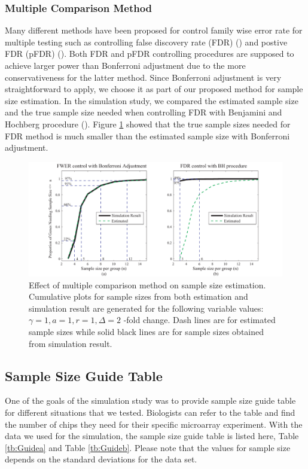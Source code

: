 \documentclass{bioinfo}
\begin{document}
\subsubsection{Multiple Comparison Method}

Many different methods have been proposed for control family wise error rate for multiple testing such as controlling false
discovery rate (FDR) (\citealp{Benjamini95}) and postive FDR (pFDR) (\citealp{Storey00}). Both FDR and pFDR controlling
procedures are supposed to achieve larger power than Bonferroni adjustment due to the more conservativeness for the latter
method. Since Bonferroni adjustment is very straightforward to apply, we choose it as part of our proposed method for sample
size estimation. In the simulation study, we compared the estimated sample size and the true sample size needed when
controlling FDR with Benjamini and Hochberg procedure (\citealp{Benjamini95}). Figure \ref{fig:ResMtd} showed that the true
sample sizes needed for FDR method is much smaller than the estimated sample size with Bonferroni adjustment.

\begin{figure}[h]
  \centerline{\includegraphics*[width=3.5 in]{ResMtd.pdf}}
  \caption[Effect of multiple comparison method on sample size estimation]
  {Effect of multiple comparison method on sample size estimation.
    Cumulative plots for sample sizes from both estimation and
    simulation result are generated for the following variable values: $\gamma = 1, a = 1, r = 1,
    \Delta = 2$ -fold change. Dash lines are for estimated sample sizes
    while solid black lines are for sample sizes obtained from simulation result.}
  \label{fig:ResMtd}
\end{figure}


\subsection{Sample Size Guide Table}

One of the goals of the simulation study was to provide sample
size guide table for different situations that we tested.
Biologists can refer to the table and find the number of chips
they need for their specific microarray experiment. With the data
we used for the simulation, the sample size guide table is listed
here, Table \ref{tb:Guidea} and Table \ref{tb:Guideb}. Please note
that the values for sample size depends on the standard deviations
for the data set.
\end{document}
